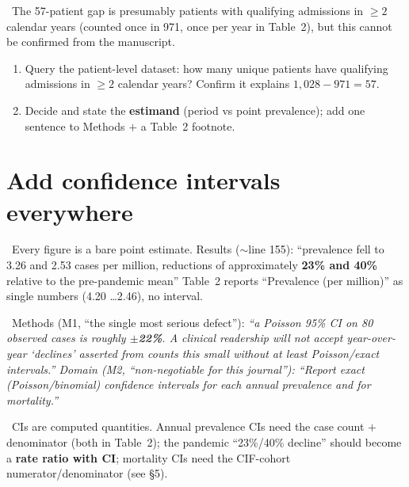 \documentclass[11pt,a4paper]{article}
\newenvironment{papersays}%
  {\def\FrameCommand{{\color{rulegray}\vrule width 1.5pt}\hspace{6pt}%
     \colorbox{paperbg}}%
   \MakeFramed{\advance\hsize-\width \FrameRestore}\small}%
  {\endMakeFramed}
\newenvironment{refereesays}%
  {\def\FrameCommand{{\color{rulegray}\vrule width 1.5pt}\hspace{6pt}%
     \colorbox{refbg}}%
   \MakeFramed{\advance\hsize-\width \FrameRestore}\small\itshape}%
  {\endMakeFramed}
\begin{document}
\whyHead\ The 57-patient gap is presumably patients with qualifying admissions in
$\geq 2$ calendar years (counted once in 971, once per year in Table~2), but this cannot be
confirmed from the manuscript.

\opHead
\begin{enumerate}[leftmargin=*, topsep=2pt]
  \item Query the patient-level dataset: how many unique patients have qualifying admissions
        in $\geq 2$ calendar years? Confirm it explains $1{,}028 - 971 = 57$.
  \item Decide and state the \textbf{estimand} (period vs point prevalence); add one sentence
        to Methods $+$ a Table~2 footnote.
\end{enumerate}

\section{Add confidence intervals everywhere}

\papersaysHead\ Every figure is a bare point estimate. Results ($\sim$line 155):
\begin{papersays}
``prevalence fell to 3.26 and 2.53 cases per million, reductions of approximately
\textbf{23\% and 40\%} relative to the pre-pandemic mean''
\end{papersays}
Table~2 reports ``Prevalence (per million)'' as single numbers (4.20 \ldots 2.46), no interval.

\ Methods (M1, ``the single most serious defect''):
\begin{refereesays}
``a Poisson 95\% CI on 80 observed cases is roughly \textbf{$\pm$22\%}. A clinical readership
will not accept year-over-year `declines' asserted from counts this small without at least
Poisson/exact intervals.''
\end{refereesays}
Domain (M2, ``non-negotiable for this journal''):
\begin{refereesays}
``Report exact (Poisson/binomial) confidence intervals for each annual prevalence and for
mortality.''
\end{refereesays}

\whyHead\ CIs are computed quantities. Annual prevalence CIs need the case count $+$
denominator (both in Table~2); the pandemic ``23\%/40\% decline'' should become a
\textbf{rate ratio with CI}; mortality CIs need the CIF-cohort numerator/denominator (see \S5).
\end{document}
